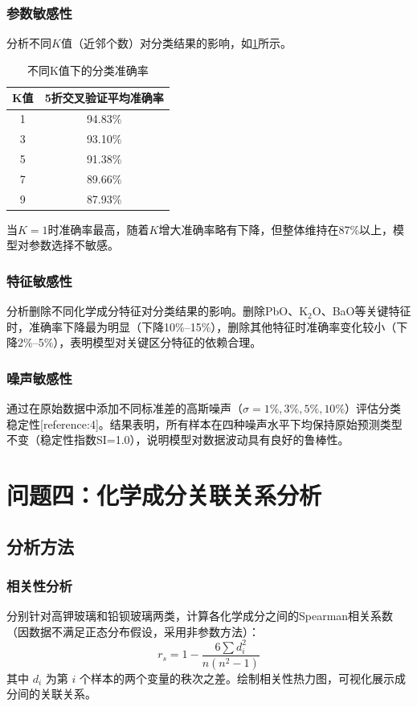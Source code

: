 \documentclass{cumcmthesis}
\begin{document}
\subsubsection{参数敏感性}
分析不同$K$值（近邻个数）对分类结果的影响，如\cref{tab:k_sensitivity}所示。

\begin{table}[!htbp]
    \centering
    \caption{不同K值下的分类准确率}
    \label{tab:k_sensitivity}
    \begin{tabular}{c|c}
        \toprule[1.5pt]
        K值 & 5折交叉验证平均准确率 \\
        \midrule[1pt]
        1 & 94.83\% \\
        3 & 93.10\% \\
        5 & 91.38\% \\
        7 & 89.66\% \\
        9 & 87.93\% \\
        \bottomrule[1.5pt]
    \end{tabular}
\end{table}

当$K=1$时准确率最高，随着$K$增大准确率略有下降，但整体维持在87\%以上，模型对参数选择不敏感。

\subsubsection{特征敏感性}
分析删除不同化学成分特征对分类结果的影响。删除PbO、K$_2$O、BaO等关键特征时，准确率下降最为明显（下降10\%--15\%），删除其他特征时准确率变化较小（下降2\%--5\%），表明模型对关键区分特征的依赖合理。

\subsubsection{噪声敏感性}
通过在原始数据中添加不同标准差的高斯噪声（$\sigma = 1\%, 3\%, 5\%, 10\%$）评估分类稳定性[reference:4]。结果表明，所有样本在四种噪声水平下均保持原始预测类型不变（稳定性指数SI=1.0），说明模型对数据波动具有良好的鲁棒性。

\section{问题四：化学成分关联关系分析}

\subsection{分析方法}

\subsubsection{相关性分析}
分别针对高钾玻璃和铅钡玻璃两类，计算各化学成分之间的Spearman相关系数（因数据不满足正态分布假设，采用非参数方法）：
\begin{equation}
    r_s = 1 - \frac{6\sum d_i^2}{n(n^2-1)}
\end{equation}
其中 $d_i$ 为第 $i$ 个样本的两个变量的秩次之差。绘制相关性热力图，可视化展示成分间的关联关系。
\end{document}
